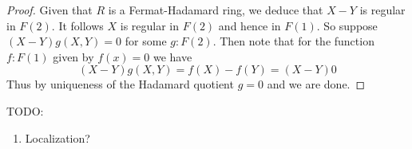 {\begin{proof}
  Given that $R$ is a Fermat-Hadamard ring, we deduce that $X-Y$ is regular in $F(2)$. 
  It follows $X$ is regular in $F(2)$ and hence in $F(1)$.
  So suppose $(X-Y)g(X,Y) = 0$ for some $g : F(2)$.
  Then note that for the function $f : F(1)$ given by $f(x) = 0$ we have
  \[ (X-Y)g(X,Y) = f(X) - f(Y) = (X - Y)0 \]
  Thus by uniqueness of the Hadamard quotient $g = 0$ and we are done.
\end{proof}



TODO:
\begin{enumerate}
  \item Localization?
\end{enumerate}

}
